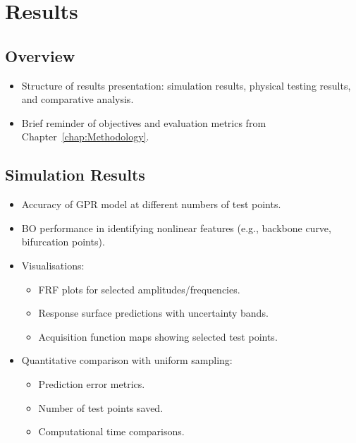 \chapter{Results}

\section{Overview}
\begin{itemize}
    \item Structure of results presentation: simulation results, physical testing results, and comparative analysis.
    \item Brief reminder of objectives and evaluation metrics from Chapter~\ref{chap:Methodology}.
\end{itemize}

\section{Simulation Results}
\begin{itemize}
    \item Accuracy of GPR model at different numbers of test points.
    \item BO performance in identifying nonlinear features (e.g., backbone curve, bifurcation points).
    \item Visualisations:
    \begin{itemize}
        \item FRF plots for selected amplitudes/frequencies.
        \item Response surface predictions with uncertainty bands.
        \item Acquisition function maps showing selected test points.
    \end{itemize}
    \item Quantitative comparison with uniform sampling:
    \begin{itemize}
        \item Prediction error metrics.
        \item Number of test points saved.
        \item Computational time comparisons.
    \end{itemize}
\end{itemize}


